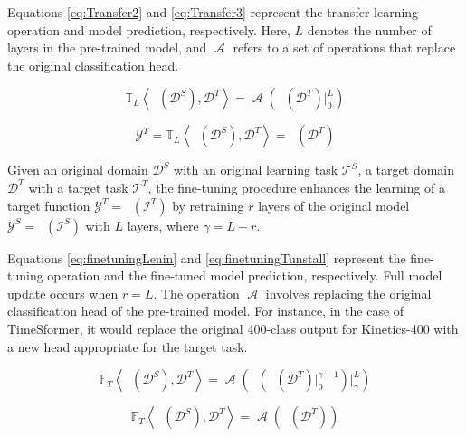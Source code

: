 \documentclass[runningheads]{llncs}
\DeclareMathOperator{\ypredtarget}{\phi^{T}}
\DeclareMathOperator{\ypredsource}{\phi^{S}}
\DeclareMathOperator{\ConvNetOut}{\mathcal{A}}
\begin{document}
Equations \eqref{eq:Transfer2} and \eqref{eq:Transfer3} represent the transfer learning operation and model prediction, respectively. Here, $L$ denotes the number of layers in the pre-trained model, and $\ConvNetOut$ refers to a set of operations that replace the original classification head.

\begin{equation}
  \mathbb{T}_{L} \left\langle \ypredsource(\mathcal{D}^{S}), \mathcal{D}^{T} \right\rangle = \ConvNetOut \left( \ypredsource(\mathcal{D}^{T}) \Bigr\rvert_{0}^{L} \right)
  \label{eq:Transfer2}
\end{equation}

\begin{equation}
  \mathcal{Y}^{T} = \mathbb{T}_{L} \left\langle \ypredsource(\mathcal{D}^{S}), \mathcal{D}^{T} \right\rangle = \ypredtarget(\mathcal{D}^{T})
  \label{eq:Transfer3}
\end{equation}

\begin{definition}
  Given an original domain $\mathcal{D}^{S}$ with an original learning task $\mathcal{T}^{S}$, a target domain $\mathcal{D}^{T}$ with a target task $\mathcal{T}^{T}$, the fine-tuning procedure enhances the learning of a target function $\mathcal{Y}^T = \ypredtarget(\mathcal{I}^T)$ by retraining $r$ layers of the original model $\mathcal{Y}^S = \ypredsource(\mathcal{I}^S)$ with $L$ layers, where $\gamma = L - r$.
\end{definition}

Equations \eqref{eq:finetuningLenin} and \eqref{eq:finetuningTunstall} represent the fine-tuning operation and the fine-tuned model prediction, respectively. Full model update occurs when $r = L$. The operation $\ConvNetOut$ involves replacing the original classification head of the pre-trained model. For instance, in the case of TimeSformer, it would replace the original 400-class output for Kinetics-400 with a new head appropriate for the target task.

\begin{equation}
  \mathbb{F}_{T} \left\langle \ypredsource(\mathcal{D}^{S}), \mathcal{D}^{T} \right\rangle = \ConvNetOut \left( \ypredsource \left( \ypredsource(\mathcal{D}^{T}) \Bigr\rvert_{0}^{\gamma - 1} \right) \Bigr\rvert_{\gamma}^{L} \right)
  \label{eq:finetuningLenin}
\end{equation}

\begin{equation}
  \mathbb{F}_{T} \left\langle \ypredsource(\mathcal{D}^{S}), \mathcal{D}^{T} \right\rangle = \ConvNetOut \left( \ypredsource(\mathcal{D}^{T}) \right)
  \label{eq:finetuningTunstall}
\end{equation}
\end{document}
